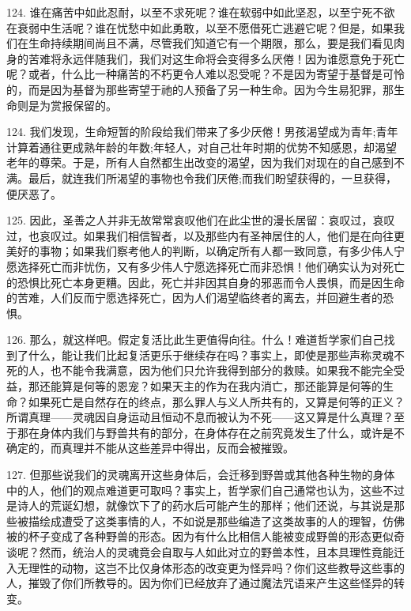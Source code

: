 124. 谁在痛苦中如此忍耐，以至不求死呢？谁在软弱中如此坚忍，以至宁死不欲在衰弱中生活呢？谁在忧愁中如此勇敢，以至不愿借死亡逃避它呢？但是，如果我们在生命持续期间尚且不满，尽管我们知道它有一个期限，那么，要是我们看见肉身的苦难将永远伴随我们，我们对这生命将会变得多么厌倦！因为谁愿意免于死亡呢？或者，什么比一种痛苦的不朽更令人难以忍受呢？不是因为寄望于基督是可怜的，而是因为基督为那些寄望于祂的人预备了另一种生命。因为今生易犯罪，那生命则是为赏报保留的。\par

124. 我们发现，生命短暂的阶段给我们带来了多少厌倦！男孩渴望成为青年;青年计算着通往更成熟年龄的年数;年轻人，对自己壮年时期的优势不知感恩，却渴望老年的尊荣。于是，所有人自然都生出改变的渴望，因为我们对现在的自己感到不满。最后，就连我们所渴望的事物也令我们厌倦;而我们盼望获得的，一旦获得，便厌恶了。\par

125. 因此，圣善之人并非无故常常哀叹他们在此尘世的漫长居留：哀叹过，哀叹过，也哀叹过。如果我们相信智者，以及那些内有圣神居住的人，他们是在向往更美好的事物；如果我们察考他人的判断，以确定所有人都一致同意，有多少伟人宁愿选择死亡而非忧伤，又有多少伟人宁愿选择死亡而非恐惧！他们确实认为对死亡的恐惧比死亡本身更糟。因此，死亡并非因其自身的邪恶而令人畏惧，而是因生命的苦难，人们反而宁愿选择死亡，因为人们渴望临终者的离去，并回避生者的恐惧。\par

126. 那么，就这样吧。假定复活比此生更值得向往。什么！难道哲学家们自己找到了什么，能让我们比起复活更乐于继续存在吗？事实上，即使是那些声称灵魂不死的人，也不能令我满意，因为他们只允许我得到部分的救赎。如果我不能完全受益，那还能算是何等的恩宠？如果天主的作为在我内消亡，那还能算是何等的生命？如果死亡是自然存在的终点，那么罪人与义人所共有的，又算是何等的正义？所谓真理——灵魂因自身运动且恒动不息而被认为不死——这又算是什么真理？至于那在身体内我们与野兽共有的部分，在身体存在之前究竟发生了什么，或许是不确定的，而真理并不能从这些差异中得出，反而会被摧毁。\par

127. 但那些说我们的灵魂离开这些身体后，会迁移到野兽或其他各种生物的身体中的人，他们的观点难道更可取吗？事实上，哲学家们自己通常也认为，这些不过是诗人的荒诞幻想，就像饮下了的药水后可能产生的那样；他们还说，与其说是那些被描绘成遭受了这类事情的人，不如说是那些编造了这类故事的人的理智，仿佛被的杯子变成了各种野兽的形态。因为有什么比相信人能被变成野兽的形态更似奇谈呢？然而，统治人的灵魂竟会自取与人如此对立的野兽本性，且本具理性竟能迁入无理性的动物，这岂不比仅身体形态的改变更为怪异吗？你们这些教导这些事的人，摧毁了你们所教导的。因为你们已经放弃了通过魔法咒语来产生这些怪异的转变。\par

